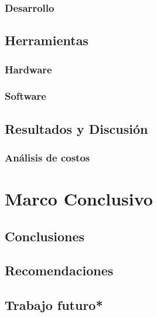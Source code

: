 \subsection{Desarrollo}
\label{sec:org1d75ce9}
\section{Herramientas}
\label{sec:orgda3c4e6}
\subsection{Hardware}
\label{sec:org3752304}
\subsection{Software}
\label{sec:orgecca71c}
\section{Resultados y Discusión}
\label{sec:org745b7cd}
\subsection{Análisis de costos}
\label{sec:org7fdab86}

\chapter{Marco Conclusivo}
\section{Conclusiones}
\label{sec:org26436e4}
\section{Recomendaciones}
\label{sec:org913deb3}
\section{Trabajo futuro*}
\label{sec:org641fcea}
